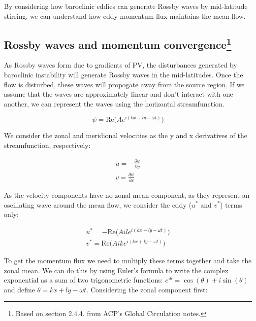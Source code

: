 \documentclass{article}
\begin{document}
By considering how baroclinic eddies can generate Rossby waves by mid-latitude stirring, we can understand how eddy momentum flux maintains the mean flow.\\

\subsection*{Rossby waves and momentum convergence\footnote[3]{Based on section 2.4.4. from ACP's Global Circulation notes.}}

As Rossby waves form due to gradients of PV, the disturbances generated by baroclinic instability will generate Rossby waves in the mid-latitudes. Once the flow is disturbed, these waves will propogate away from the source region. If we assume that the waves are approximately linear and don't interact with one another, we can represent the waves using the horizontal streamfunction.

\begin{equation}
    \psi = \text{Re} \biggl( A e^{i(kx + ly - \omega t)}\biggr)
    \label{eq:streamfunction}
\end{equation}

We consider the zonal and meridional velocities as the y and x derivatives of the streamfunction, respectively:

\begin{align*}
    u = - \frac{\partial \psi}{\partial y} \\
    v = \frac{\partial \psi}{\partial x}
    \label{eq:uv_streamfunction}
\end{align*}

As the velocity components have no zonal mean component, as they represent an oscillating wave around the mean flow, we consider the eddy ($u^*$ and $v^*$) terms only:

\begin{align*}
    u^* = -\text{Re} \biggl( A il e^{i(kx + ly - \omega t)}\biggr) \\
    v^* = \text{Re} \biggl( A ik e^{i(kx + ly - \omega t)}\biggr)
    \label{eq:uv_eddy}
\end{align*}

To get the momentum flux we need to multiply these terms together and take the zonal mean. We can do this by using Euler's formula to write the complex exponential as a sum of two trigonometric functions: $e^{i\theta} = \cos(\theta) + i \sin(\theta)$ and define $\theta = kx + ly - \omega t$. Considering the zonal component first:
\end{document}
